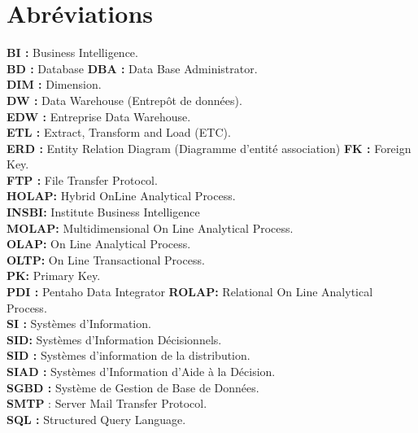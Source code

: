 \chapter{Abréviations}
\textbf{BI :} Business Intelligence.\\
\textbf{BD :} Database
\textbf{DBA :} Data Base Administrator.\\
\textbf{DIM :} Dimension.\\
\textbf{DW :} Data Warehouse (Entrepôt de données).\\
\textbf{EDW :} Entreprise Data Warehouse.\\
\textbf{ETL :} Extract, Transform and Load (ETC).\\
\textbf{ERD :} Entity Relation Diagram (Diagramme d'entité association)
\textbf{FK :} Foreign Key.\\
\textbf{FTP :} File Transfer Protocol.\\
\textbf{HOLAP:} Hybrid OnLine Analytical Process.\\
\textbf{INSBI:} Institute Business Intelligence\\
\textbf{MOLAP:} Multidimensional On Line Analytical Process.\\
\textbf{OLAP:} On Line Analytical Process.\\
\textbf{OLTP:} On Line Transactional Process.\\
\textbf{PK:} Primary Key.\\
\textbf{PDI :} Pentaho Data Integrator
\textbf{ROLAP:} Relational On Line Analytical Process.\\
\textbf{SI :} Systèmes d’Information.\\
\textbf{SID:} Systèmes d’Information Décisionnels.\\
\textbf{SID :} Systèmes d’information de la distribution.\\
\textbf{SIAD :} Systèmes d’Information d’Aide à la Décision.\\
\textbf{SGBD :} Système de Gestion de Base de Données.\\
\textbf{SMTP }: Server Mail Transfer Protocol.\\
\textbf{SQL :} Structured Query Language.\\
